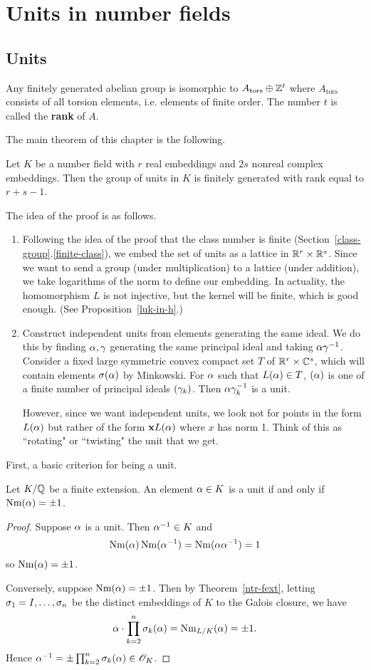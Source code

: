 \chapter{Units in number fields}
\section{Units}
Any finitely generated abelian group is isomorphic to $A_{\text{tors}}\oplus \mathbb{Z}^t$ where $A_{\text{tors}}$ consists of all torsion elements, i.e. elements of finite order. The number $t$ is called the \textbf{rank} of $A$.

The main theorem of this chapter is the following.
\begin{thm}
Let $K$ be a number field with $r$ real embeddings and $2s$ nonreal complex embeddings. Then
the group of units in $K$ is finitely generated with rank equal to $r+s-1$.
\end{thm}
The idea of the proof is as follows.
\begin{enumerate}
\item Following the idea of the proof that the class number is finite (Section~\ref{class-group}.\ref{finite-class}), we embed the set of units as a lattice in $\mathbb{R}^r\times \mathbb{R}^s$. Since we want to send a group (under multiplication) to a lattice (under addition), we take logarithms of the norm to define our embedding. In actuality, the homomorphism $L$ is not injective, but the kernel will be finite, which is good enough. (See  Proposition~\ref{luk-in-h}.)
\item Construct independent units from elements generating the same ideal. We do this by finding $\alpha,\gamma$ generating the same principal ideal and taking $\alpha\gamma^{-1}$.
Consider a fixed large symmetric convex compact set $T$ of $\mathbb{R}^{r}\times \mathbb{C}^s$, which will contain elements $\sigma(\alpha)$ by Minkowski. For $\alpha$ such that $L(\alpha)\in T$, $(\alpha)$ is one of a finite number of principal ideals $(\gamma_k)$. Then $\alpha\gamma_k^{-1}$ is a unit.

However, since we want independent units, we look not for points in the form $L(\alpha)$ but rather of the form $\mathbf xL(\alpha)$ where $x$ has norm 1. Think of this as ``rotating" or ``twisting" the unit that we get.
\end{enumerate}

First, a basic criterion for being a unit.
\begin{pr}
Let $K/\mathbb{Q}$ be a finite extension. 
An element $\alpha\in K$ is a unit if and only if $\operatorname{Nm}(\alpha)=\pm 1$.
\end{pr}
\begin{proof}
Suppose $\alpha$ is a unit. Then $\alpha^{-1}\in K$ and
\[
\nm(\al)\nm(\al^{-1})=\nm(\al\al^{-1})%
=1
\]
so $\operatorname{Nm}(\alpha)=\pm1$.

Conversely, suppose $\operatorname{Nm}(\alpha)=\pm 1$. Then by Theorem~\ref{ntr-fext}, letting $\sigma_1=I,\ldots,\sigma_n$ be the distinct embeddings of $K$ to the Galois closure, we have
\[
\alpha\cdot \prod_{k=2}^n \sigma_k(\alpha)=\operatorname{Nm}_{L/K}(\alpha)=\pm1.
\]
Hence $\alpha^{-1}=\pm \prod_{k=2}^n \sigma_k(\alpha)\in \mathscr{O}_K$. 
\end{proof}
